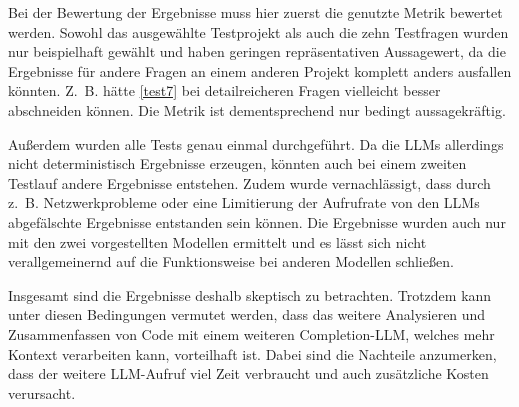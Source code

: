 \documentclass[../main.tex]{subfiles}
\begin{document}
Bei der Bewertung der Ergebnisse muss hier zuerst die genutzte Metrik bewertet werden.
Sowohl das ausgewählte Testprojekt als auch die zehn Testfragen wurden nur beispielhaft gewählt und haben geringen repräsentativen Aussagewert, da die Ergebnisse für andere Fragen an einem anderen Projekt komplett anders ausfallen könnten.
Z. B. hätte \ref{test7} bei detailreicheren Fragen vielleicht besser abschneiden können.
Die Metrik ist dementsprechend nur bedingt aussagekräftig.

Außerdem wurden alle Tests genau einmal durchgeführt. 
Da die \glspl{LLM} allerdings nicht deterministisch Ergebnisse erzeugen, könnten auch bei einem zweiten Testlauf andere Ergebnisse entstehen.
Zudem wurde vernachlässigt, dass durch z. B.  Netzwerkprobleme oder eine Limitierung der Aufrufrate von den \glspl{LLM} abgefälschte Ergebnisse entstanden sein können.
Die Ergebnisse wurden auch nur mit den zwei vorgestellten Modellen ermittelt und es lässt sich nicht verallgemeinernd auf die Funktionsweise bei anderen Modellen schließen.

Insgesamt sind die Ergebnisse deshalb skeptisch zu betrachten.
Trotzdem kann unter diesen Bedingungen vermutet werden, dass das weitere Analysieren und Zusammenfassen von Code mit einem weiteren Completion-\gls{LLM}, welches mehr Kontext verarbeiten kann, vorteilhaft ist.
Dabei sind die Nachteile anzumerken, dass der weitere \gls{LLM}-Aufruf viel Zeit verbraucht und auch zusätzliche Kosten verursacht. 
\end{document}
